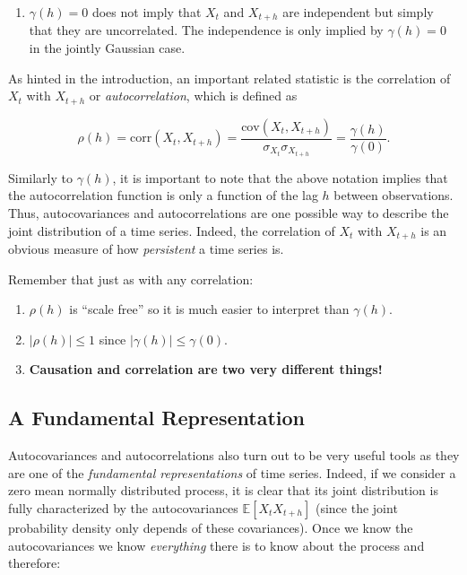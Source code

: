 \documentclass[]{book}
\providecommand{\tightlist}{%
  \setlength{\itemsep}{0pt}\setlength{\parskip}{0pt}}
\theoremstyle{definition}
\theoremstyle{definition}
\theoremstyle{definition}
\theoremstyle{remark}
\begin{document}
\begin{enumerate}
\def\labelenumi{\arabic{enumi}.}
\setcounter{enumi}{4}
\tightlist
\item
  \({\gamma}\left( {h} \right)=0\) does not imply that \(X_t\) and
  \(X_{t+h}\) are independent but simply that they are uncorrelated. The
  independence is only implied by \({\gamma}\left( {h} \right)=0\) in
  the jointly Gaussian case.
\end{enumerate}

As hinted in the introduction, an important related statistic is the
correlation of \(X_t\) with \(X_{t+h}\) or \emph{autocorrelation}, which
is defined as

\[\rho \left(  h \right) = \text{corr}\left( {{X_t},{X_{t + h}}} \right) = \frac{{\text{cov}\left( {{X_t},{X_{t + h}}} \right)}}{{{\sigma _{{X_t}}}{\sigma _{{X_{t + h}}}}}} = \frac{\gamma(h) }{\gamma(0)}.\]

Similarly to \(\gamma(h)\), it is important to note that the above
notation implies that the autocorrelation function is only a function of
the lag \(h\) between observations. Thus, autocovariances and
autocorrelations are one possible way to describe the joint distribution
of a time series. Indeed, the correlation of \(X_t\) with \(X_{t+h}\) is
an obvious measure of how \emph{persistent} a time series is.

Remember that just as with any correlation:

\begin{enumerate}
\def\labelenumi{\arabic{enumi}.}
\tightlist
\item
  \(\rho \left( h \right)\) is ``scale free'' so it is much easier to
  interpret than \(\gamma(h)\).
\item
  \(|\rho \left( h \right)| \leq 1\) since
  \(|\gamma(h)| \leq \gamma(0)\).
\item
  \textbf{Causation and correlation are two very different things!}
\end{enumerate}

\hypertarget{a-fundamental-representation}{%
\subsection{A Fundamental
Representation}\label{a-fundamental-representation}}

Autocovariances and autocorrelations also turn out to be very useful
tools as they are one of the \emph{fundamental representations} of time
series. Indeed, if we consider a zero mean normally distributed process,
it is clear that its joint distribution is fully characterized by the
autocovariances \(\mathbb{E}[X_t X_{t+h}]\) (since the joint probability
density only depends of these covariances). Once we know the
autocovariances we know \emph{everything} there is to know about the
process and therefore:
\end{document}

